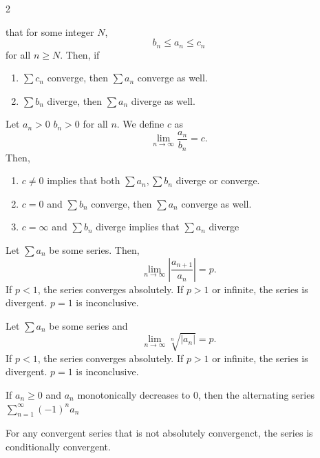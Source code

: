 \documentclass[5pt, a4paper]{article}
\begin{document}
\begin{multicols}{2}
\begin{tcolorbox}[title=Comparison Test]
       that for some integer $N$, \[
       b_n \le a_n \le c_n
       \] 
       for all $n \ge N$. Then, if 
       \begin{enumerate}
           \item $\sum c_n$ converge, then $\sum a_n$ converge as well.
            \item $\sum b_n$ diverge, then $\sum a_n$ diverge as well.
       \end{enumerate}
   \end{tcolorbox}
   \begin{tcolorbox}[title=Limit Comparison Test]
       Let $a_n > 0$ $b_n >0$ for all $n$. We define $c$ as \[
           \lim_{n \to \infty} \frac{a_n}{b_n} = c
       .\] 
       Then, 
       \begin{enumerate}
           \item $c \neq 0$ implies that both $\sum a_n, \sum b_n$ diverge or
               converge.
           \item $c = 0$ and $\sum b_n$ converge, then $\sum a_n$ converge as
               well.
           \item $c = \infty$ and $\sum b_n$ diverge implies that $\sum a_n$ diverge
       \end{enumerate}
   \end{tcolorbox}
\begin{tcolorbox}[title=Ratio Test]
    Let $\sum a_n$ be some series. Then,  \[
        \lim_{n \to \infty} \left| \frac{a_{n+1}}{a_n} \right| = p
    .\] 
    If $p < 1$, the series converges absolutely. If $p > 1$ or infinite, the
    series is divergent. $p = 1$ is inconclusive.
\end{tcolorbox}

\begin{tcolorbox}[title=Root Test]
    Let $\sum a_n$ be some series and  \[
        \lim_{n \to  \infty} \sqrt[n]{|a_n|} = p
    .\] 
    If $p < 1$, the series converges absolutely. If $p > 1$ or infinite, the
    series is divergent. $p = 1$ is inconclusive.
\end{tcolorbox}
\begin{tcolorbox}[title=Alternating Series Test]
    If $a_n \ge 0$ and $a_n$ monotonically decreases to 0, then the alternating
    series  $\sum_{n=1}^\infty (-1)^n a_n$
\end{tcolorbox}
\begin{tcolorbox}[title=Conditional Convergence]
    For any convergent series that is not absolutely convergenct, the series is
    conditionally convergent.
\end{tcolorbox}
\end{multicols}
\end{document}
